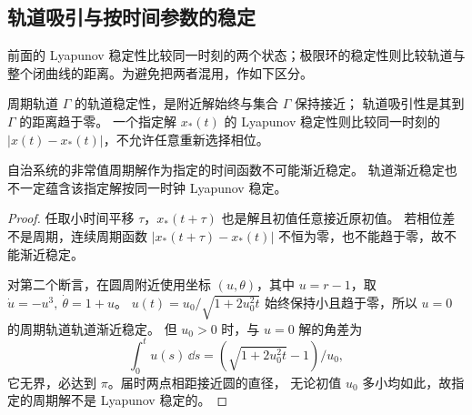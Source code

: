 \subsection*{轨道吸引与按时间参数的稳定}
\label{sec:orbital-versus-time}
前面的 Lyapunov 稳定性比较同一时刻的两个状态；极限环的稳定性则比较轨道与整个闭曲线的距离。为避免把两者混用，作如下区分。
\begin{definition}
周期轨道 $\Gamma$ 的轨道稳定性，是附近解始终与集合 $\Gamma$ 保持接近；
轨道吸引性是其到 $\Gamma$ 的距离趋于零。
一个指定解 $x_*(t)$ 的 Lyapunov 稳定性则比较同一时刻的
$|x(t)-x_*(t)|$，不允许任意重新选择相位。
\end{definition}
\begin{proposition}
自治系统的非常值周期解作为指定的时间函数不可能渐近稳定。
轨道渐近稳定也不一定蕴含该指定解按同一时钟 Lyapunov 稳定。
\end{proposition}
\begin{proof}
任取小时间平移 $\tau$，$x_*(t+\tau)$ 也是解且初值任意接近原初值。
若相位差不是周期，连续周期函数
$|x_*(t+\tau)-x_*(t)|$ 不恒为零，也不能趋于零，故不能渐近稳定。

对第二个断言，在圆周附近使用坐标 $(u,\theta)$，其中 $u=r-1$，取
$\dot u=-u^3,\ \dot\theta=1+u$。
$u(t)=u_0/\sqrt{1+2u_0^2t}$ 始终保持小且趋于零，所以 $u=0$ 的周期轨道轨道渐近稳定。
但 $u_0>0$ 时，与 $u=0$ 解的角差为
\[
 \displaystyle\int_0^tu(s)\,\dd s=(\sqrt{1+2u_0^2t}-1)/u_0,
\]
它无界，必达到 $\pi$。届时两点相距接近圆的直径，
无论初值 $u_0$ 多小均如此，故指定的周期解不是 Lyapunov 稳定的。
\end{proof}
